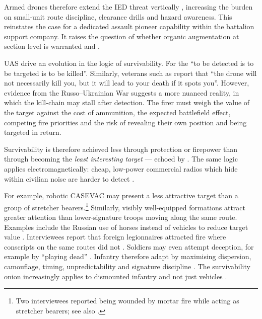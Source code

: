Armed drones therefore extend the IED threat vertically \parencite{danny_participant_5}, increasing the burden on small-unit route discipline, clearance drills and hazard awareness. This reinstates the case for a dedicated assault pioneer capability within the battalion support company. It raises the question of whether organic augmentation at section level is warranted \parencite[28:14--30:47]{lyle_23_interview} and \parencite{stu_lyle_participant_11}.


UAS drive an evolution in the logic of survivability. For the \textcite[6]{USMC_MOC_2016} ``to be detected is to be targeted is to be killed''. Similarly, veterans such as \textcite[9:15--10:55]{Gifford_m_2025325} report that ``the drone will not necessarily kill you, but it will lead to your death if it spots you''. However, evidence from the Russo--Ukrainian War suggests a more nuanced reality, in which the kill-chain may stall after detection. The firer must weigh the value of the target against the cost of ammunition, the expected battlefield effect, competing fire priorities and the risk of revealing their own position and being targeted in return.

Survivability is therefore achieved less through protection or firepower than through becoming the \textit{least interesting target} --- echoed by \textcite[53]{neron_bancel_2024_05_27}. The same logic applies electromagnetically: cheap, low-power commercial radios which hide within civilian noise are harder to detect \parencite{Birchfield_2026}.

For example, robotic CASEVAC may present a less attractive target than a group of stretcher bearers.\footnote{Two interviewees reported being wounded by mortar fire while acting as stretcher bearers; see also \textcite{landforces_ukraine_2026_CASEVAC}.} Similarly, visibly well-equipped formations  attract greater attention than lower-signature troops moving along the same route. Examples include the Russian use of horses instead of vehicles to reduce target value \parencite{Axe_horses_2026}. Interviewees report that foreign legionnaires attracted fire where conscripts on the same routes  did not \parencite{david_participant_2,darragh_participant_4}. Soldiers may even attempt deception, for example by ``playing dead'' \parencite{magyar_telegram_FPV_inf_plying_dead}. Infantry therefore adapt by maximising dispersion, camouflage, timing, unpredictability and signature discipline \parencite{TCAG_Brad}. The survivability onion increasingly applies to dismounted infantry and not just vehicles \parencite{Hemez_2017}.


